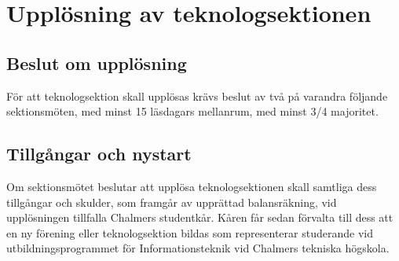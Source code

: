 \section{Upplösning av teknologsektionen}

\subsection{Beslut om upplösning}

För att teknologsektion skall upplösas krävs beslut av två på varandra följande sektionsmöten, med minst 15 läsdagars mellanrum, med minst 3/4 majoritet.


\subsection{Tillgångar och nystart}

Om sektionsmötet beslutar att upplösa teknologsektionen skall samtliga dess tillgångar och skulder, som framgår av upprättad balansräkning, vid upplösningen tillfalla Chalmers studentkår. Kåren får sedan förvalta till dess att en ny förening eller teknologsektion bildas som representerar studerande vid utbildningsprogrammet för Informationsteknik vid Chalmers tekniska högskola.